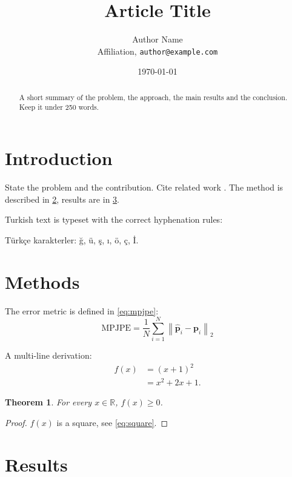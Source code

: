\documentclass[11pt,a4paper]{article}
\title{Article Title}
\author{Author Name\\ \small Affiliation, \texttt{author@example.com}}
\date{\today}
\newtheorem{theorem}{Theorem}
\begin{document}
\maketitle

\begin{abstract}
  A short summary of the problem, the approach, the main results and the
  conclusion. Keep it under 250 words.
\end{abstract}

\section{Introduction}
\label{sec:introduction}

State the problem and the contribution. Cite related work
\autocite{knuth1984texbook,lamport1994latex}. The method is described in
\cref{sec:methods}, results are in \cref{sec:results}.

Turkish text is typeset with the correct hyphenation rules:
\begin{turkish}
  Türkçe karakterler: ğ, ü, ş, ı, ö, ç, İ.
\end{turkish}

\section{Methods}
\label{sec:methods}

The error metric is defined in \cref{eq:mpjpe}:
\begin{equation}
  \mathrm{MPJPE} = \frac{1}{N} \sum_{i=1}^{N}
  \left\| \hat{\mathbf{p}}_i - \mathbf{p}_i \right\|_2
  \label{eq:mpjpe}
\end{equation}

A multi-line derivation:
\begin{align}
  f(x) & = {(x + 1)}^2        \label{eq:square} \\
       & = x^2 + 2x + 1.    \nonumber
\end{align}

\begin{theorem}
  \label{thm:example}
  For every $x \in \mathbb{R}$, $f(x) \geq 0$.
\end{theorem}

\begin{proof}
  $f(x)$ is a square, see \cref{eq:square}.
\end{proof}

\section{Results}
\label{sec:results}
\end{document}
